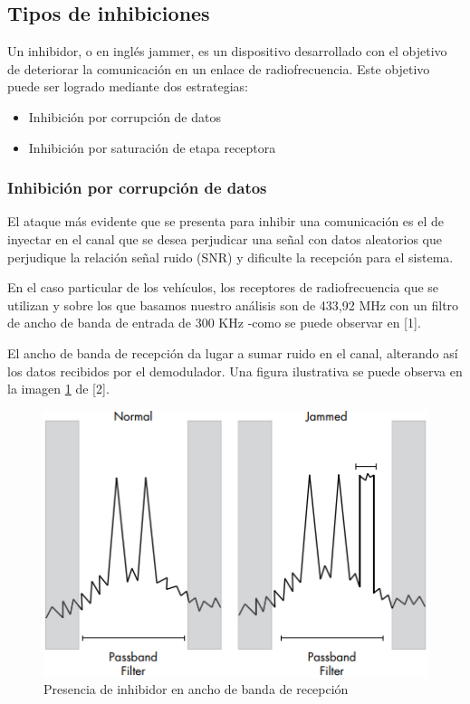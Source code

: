 \documentclass[12pt]{report}
\begin{document}
\subsection{Tipos de inhibiciones}

Un inhibidor, o en inglés jammer, es un dispositivo desarrollado con el objetivo de deteriorar la comunicación en un enlace de 
radiofrecuencia. Este objetivo puede ser logrado mediante dos estrategias:

\begin{itemize}
    \item Inhibición por corrupción de datos
    \item Inhibición por saturación de etapa receptora

\end{itemize}

\subsubsection{Inhibición por corrupción de datos}

El ataque más evidente que se presenta para inhibir una comunicación es el de inyectar en el canal que se desea perjudicar una señal con 
datos aleatorios que perjudique la relación señal ruido (SNR) y dificulte la recepción para el sistema. \par
En el caso particular de los vehículos, los receptores de radiofrecuencia que se utilizan y sobre los que basamos nuestro análisis
son de 433,92 MHz con un filtro de ancho de banda de entrada de 300 KHz -como se puede observar en [1].\par
El ancho de banda de recepción da lugar a sumar ruido en el canal, alterando así los datos recibidos por el demodulador. Una figura
ilustrativa se puede observa en la imagen \ref{fpb_jam} de [2].

\begin{figure}[htb]
	\centering
	\includegraphics[scale=0.8]{fpb_jam.png}
	\caption{Presencia de inhibidor en ancho de banda de recepción}
	\label{fpb_jam}
\end{figure}
\end{document}
